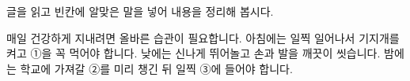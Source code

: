 \documentclass[fs13,seriesSau]{korfarm-base}
\begin{document}
\kfActivityBg \par{}\par\nopagebreak[4]\smallskip\nopagebreak[4]
\begin{kfBlankList}
\kfBlankItem 글을 읽고 빈칸에 알맞은 말을 넣어 내용을 정리해 봅시다.

매일 건강하게 지내려면 올바른 습관이 필요합니다.  아침에는 일찍 일어나서 기지개를 켜고 ①\kfFillBlank[12mm]{}을 꼭 먹어야 합니다.  낮에는 신나게 뛰어놀고 손과 발을 깨끗이 씻습니다.  밤에는 학교에 가져갈 ②\kfFillBlank[12mm]{}를 미리 챙긴 뒤 일찍 ③\kfFillBlank[12mm]{}에 들어야 합니다.
\end{kfBlankList}

\kfActivityBg \par{}\par\nopagebreak[4]\smallskip\nopagebreak[4]

\end{document}
